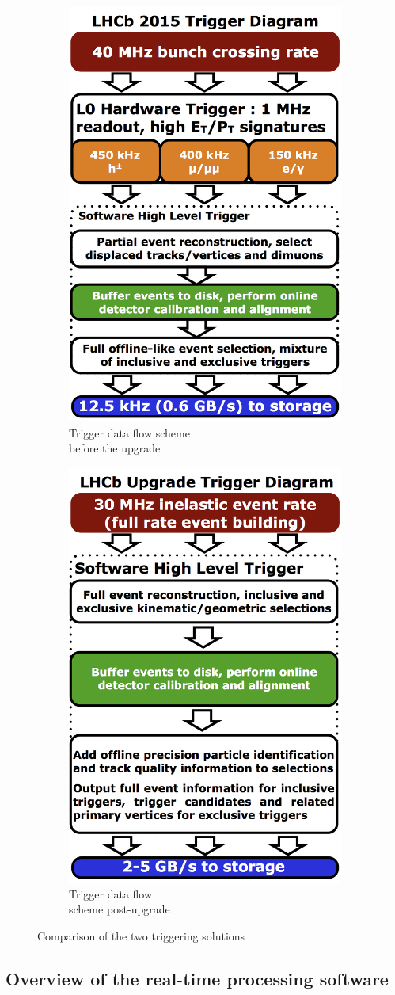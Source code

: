 \documentclass[12pt]{article}
\begin{document}
\begin{figure}[H]
	\centering
	\begin{subfigure}{.5\textwidth}
		\centering
		\includegraphics[width=.4\linewidth]{LHCb_Trigger_RunII_May2015}
		\caption{Trigger data flow scheme\\ before the upgrade}
		\label{fig_trigger_compare_sub1}
	\end{subfigure}%
	\begin{subfigure}{.5\textwidth}
		\centering
		\includegraphics[width=.4\linewidth]{LHCb_Trigger_RunIII_May2015}
		\caption{Trigger data flow\\ scheme post-upgrade}
		\label{fig_trigger_compare_sub2}
	\end{subfigure}
	\caption{Comparison of the two triggering solutions}
	\label{fig_trigger_compare}
\end{figure}


\subsection{Overview of the real-time processing software}\label{sec_reco_sw_overview}
	
\end{document}
